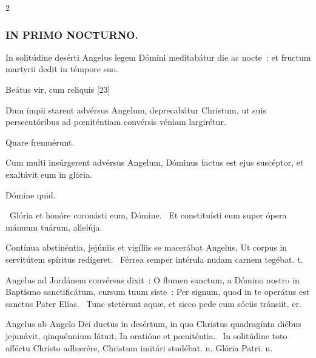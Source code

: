 \documentclass[9pt,twoside]{extarticle}
\begin{document}
\begin{multicols}{2}
{\subsubsection*{\center \textsc{IN PRIMO NOCTURNO.}}
\begin{tightlist}{}
\item {} In solitúdine desérti Angelus legem Dómini meditabátur die ac nocte~: et fructum martyrii dedit in témpore suo.
\item {} Beátus vir, cum reliquis  [23]
\item {} Dum ímpii starent advérsus Angelum, deprecabátur Christum, ut suis persecutóribus ad pœniténtiam convérsis véniam largirétur.
\item {} Quare fremuérunt.
\item {} Cum multi insúrgerent advérsus Angelum, Dóminus factus est ejus suscéptor, et exaltávit eum in glória.
\item {} Dómine quid.
\item {}~Glória et honóre coronásti eum, Dómine. ~Et constituísti eum super ópera mánuum tuárum, allelúja.
\item {}
\item {} Contínua abstinéntia, jejúniis et vigíliis se macerábat Angelus, \textred{*} Ut corpus in servitútem spíritus redígeret. ~Férrea semper intérula nudam carnem tegébat. t.
\item {} Angelus ad Jordánem convérsus dixit~: O flumen sanctum, a Dómino nostro in Baptísmo sanctificátum, cursum tuum siste~: \textred{*} Per signum, quod in te operátus est sanctus Pater Elías. ~Tunc stetérunt aquæ, et sicco pede cum sóciis tránsiit. er.
\item {} Angelus ab Angelo Dei ductus in desértum, in quo Christus quadragínta diébus jejunávit, qinquénnium látuit, \textred{*} In oratióne et pœniténtia. ~In solitúdine toto afféctu Christo adhærére, Christum imitári studébat. n. Glória Patri. n.
\end{tightlist}

}
\end{multicols}
\end{document}

